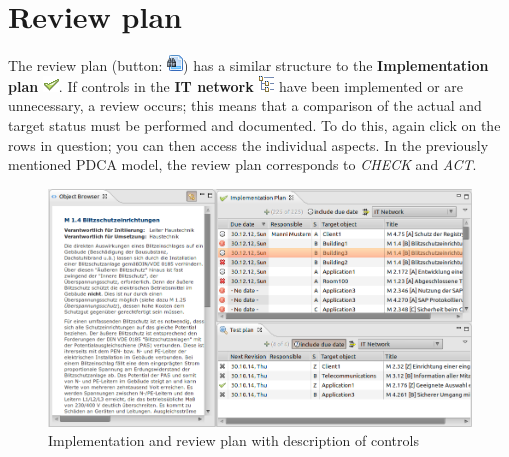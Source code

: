 \documentclass[a4paper,10pt]{book}
\begin{document}
\section{Review plan}
 The review plan (button: \includegraphics[height=2ex]{Icon/Pruefplan.png}) has a similar structure to the
 \textbf{Implementation plan} \includegraphics[height=2ex]{Icon/Okay.png}. If controls in the
 \textbf{IT network} \includegraphics[height=2ex]{Icon/GS_Modell.png}
 have been implemented or are unnecessary, a review occurs; this means that a comparison of the
 actual and target status must be performed and documented. To do this, again click on the rows
 in question; you can then access the individual aspects. In the previously mentioned PDCA model,
 the review plan corresponds to {\em CHECK} and {\em ACT}.
 \begin{figure}[htb!]
  \centering
  \includegraphics[scale=.24]{Screenshot/Realisierungsplan-en.png}
  \caption{\label{Implementation and review plan with description of controls} Implementation and review plan with description of controls}
\end{figure}
\end{document}
